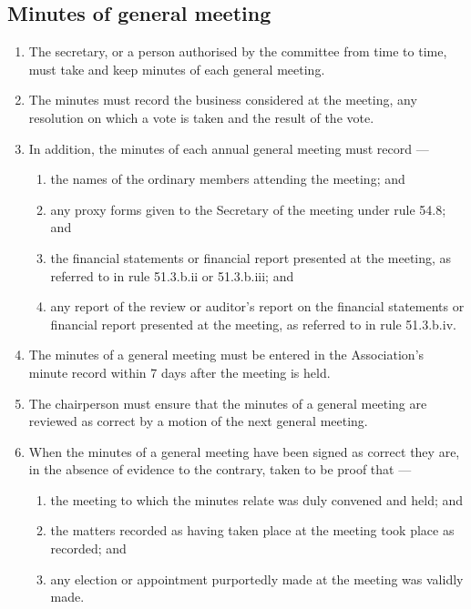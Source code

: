 \documentclass[../constitution.tex]{subfiles}
\begin{document}
\hypertarget{minutes-of-general-meeting}{%
\subsection{Minutes of general meeting}\label{minutes-of-general-meeting}}

\begin{enumerate}

\item The secretary, or a person authorised by the committee from time to time, must take and keep minutes of each general meeting.
\item The minutes must record the business considered at the meeting, any resolution on which a vote is taken and the result of the vote.
\item In addition, the minutes of each annual general meeting must record ---

  \begin{enumerate}
  
  \item the names of the ordinary members attending the meeting; and
  \item any proxy forms given to the Secretary of the meeting under rule 54.8; and
  \item the financial statements or financial report presented at the meeting, as referred to in rule 51.3.b.ii or 51.3.b.iii; and
  \item any report of the review or auditor's report on the financial statements or financial report presented at the meeting, as referred to in rule 51.3.b.iv.
  \end{enumerate}
\item The minutes of a general meeting must be entered in the Association's minute record within 7 days after the meeting is held.
\item The chairperson must ensure that the minutes of a general meeting are reviewed as correct by a motion of the next general meeting.
\item When the minutes of a general meeting have been signed as correct they are, in the absence of evidence to the contrary, taken to be proof that ---

  \begin{enumerate}
  
  \item the meeting to which the minutes relate was duly convened and held; and
  \item the matters recorded as having taken place at the meeting took place as recorded; and
  \item any election or appointment purportedly made at the meeting was validly made.
  \end{enumerate}
\end{enumerate}
\end{document}
